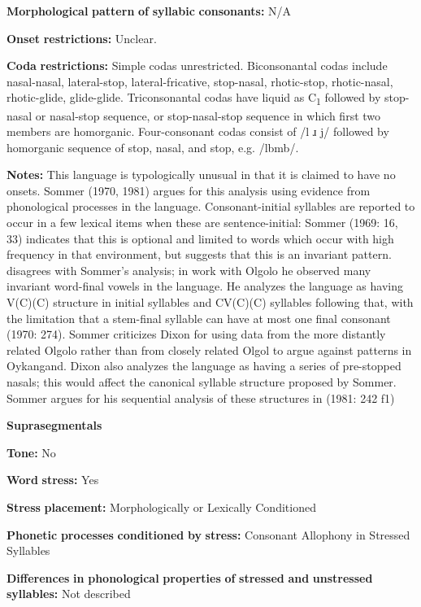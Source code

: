 \begin{styleBody}
\textbf{Morphological} \textbf{pattern} \textbf{of} \textbf{syllabic} \textbf{consonants:} N/A

\textbf{Onset} \textbf{restrictions:} Unclear.

\textbf{Coda} \textbf{restrictions:} Simple codas unrestricted. Biconsonantal codas include nasal-nasal, lateral-stop, lateral-fricative, stop-nasal, rhotic-stop, rhotic-nasal, rhotic-glide, glide-glide. Triconsonantal codas have liquid as C\textsubscript{1} followed by stop-nasal or nasal-stop sequence, or stop-nasal-stop sequence in which first two members are homorganic. Four-consonant codas consist of /l ɹ j/ followed by homorganic sequence of stop, nasal, and stop, e.g. /lbmb/.

\textbf{Notes:} This language is typologically unusual in that it is claimed to have no onsets. Sommer (1970, 1981) argues for this analysis using evidence from phonological processes in the language. Consonant-initial syllables are reported to occur in a few lexical items when these are sentence-initial: Sommer (1969: 16, 33) indicates that this is optional and limited to words which occur with high frequency in that environment, but \citet{Sommer1981} suggests that this is an invariant pattern. \citet{Dixon1970} disagrees with Sommer’s analysis; in work with Olgolo he observed many invariant word-final vowels in the language. He analyzes the language as having V(C)(C) structure in initial syllables and CV(C)(C) syllables following that, with the limitation that a stem-final syllable can have at most one final consonant (1970: 274). Sommer criticizes Dixon for using data from the more distantly related Olgolo rather than from closely related Olgol to argue against patterns in Oykangand. Dixon also analyzes the language as having a series of pre-stopped nasals; this would affect the canonical syllable structure proposed by Sommer. Sommer argues for his sequential analysis of these structures in (1981: 242 f1)

\textbf{Suprasegmentals}

\textbf{Tone:} No

\textbf{Word} \textbf{stress:} Yes

\textbf{Stress} \textbf{placement:} Morphologically or Lexically Conditioned

\textbf{Phonetic} \textbf{processes} \textbf{conditioned} \textbf{by} \textbf{stress:} Consonant Allophony in Stressed Syllables

\textbf{Differences} \textbf{in} \textbf{phonological} \textbf{properties} \textbf{of} \textbf{stressed} \textbf{and} \textbf{unstressed} \textbf{syllables:} Not described


\end{styleBody}

